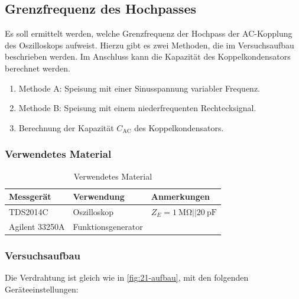 \subsection{Grenzfrequenz des Hochpasses}\label{sec:2-2}

\begin{highlightblock}
	Es soll ermittelt werden, welche Grenzfrequenz der Hochpass der AC-Kopplung des
	Oszilloskops aufweist. Hierzu gibt es zwei Methoden, die im Versuchsaufbau beschrieben
	werden. Im Anschluss kann die Kapazität des Koppelkondensators berechnet werden.
	\begin{enumerate}[label=\textbf{\alph*:}, ref=\alph*, noitemsep]
		\item\label{itm:2-P2-1} Methode A: Speisung mit einer Sinusspannung variabler Frequenz.
		\item\label{itm:2-P2-2} Methode B: Speisung mit einem niederfrequenten Rechtecksignal.
		\item\label{itm:2-P2-3} Berechnung der Kapazität $C_\mathrm{AC}$ des Koppelkondensators.
	\end{enumerate}
\end{highlightblock}

\subsubsection{Verwendetes Material}

\begin{table}[h]
	\centering
	\caption{Verwendetes Material}
	\begin{tabularx}{\textwidth}{XXX}
		\textbf{Messgerät} & \textbf{Verwendung} & \textbf{Anmerkungen}                            \\ \midrule
		TDS2014C           & Oszilloskop         & $Z_E = \SI{1}{\mega\ohm}||\SI{20}{\pico\farad}$ \\
		Agilent 33250A     & Funktionsgenerator  &                                                 \\
	\end{tabularx}
\end{table}

\subsubsection{Versuchsaufbau}

\marginref{\ref{itm:2-P2-1}}
Die Verdrahtung ist gleich wie in \autoref{fig:21-aufbau}, mit den folgenden
Geräteeinstellungen:

